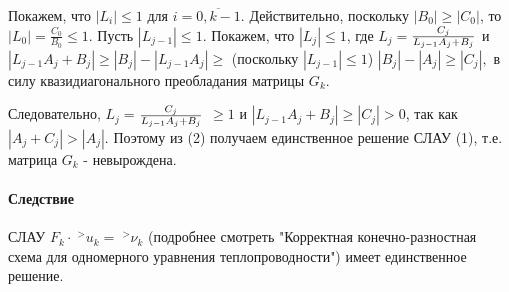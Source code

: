 \documentclass[__main__.tex]{subfiles}
\begin{document}
Покажем, что $|L_i| \leq 1$ для $i = \overline{0,k-1}$. Действительно, поскольку $|B_0|\geq|C_0|$, то $|L_0| = $$\frac{C_0}{B_0}$$ \leq 1$. Пусть $|L_{j-1}| \leq 1$. Покажем, что  $|L_{j}| \leq 1$, где $L_j = $${C_{j}}\over{L_{j-1}A_j + B_j}$ и $|L_{j-1}A_j + B_j|  \geq |B_j| - |L_{j-1}A_j| \geq$ (поскольку $|L_{j-1}| \leq 1$) $ |B_j|-|A_j| \geq |C_j|,$ в силу квазидиагонального преобладания матрицы $ G_k$.

Следовательно, $L_j = $${C_{j}}\over{L_{j-1}A_j + B_j}$ $\geq 1$ и $|L_{j-1}A_j + B_j|  \geq |C_j| > 0$, так как $|A_j + C_j|  > |A_j|$. Поэтому из (2) получаем единственное решение СЛАУ (1), т.е. матрица $G_k$ - невырождена.

\paragraph{Следствие}

СЛАУ $F_k \cdot \;^{>}u_k = \;^{>}\nu_k$ (подробнее смотреть "Корректная конечно-разностная схема для одномерного уравнения теплопроводности") имеет единственное решение.
\end{document}
